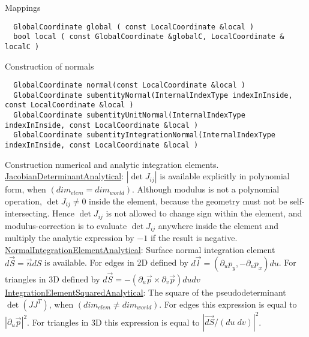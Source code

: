 Mappings \\
\begin{mybox}
\begin{lstlisting}
  GlobalCoordinate global ( const LocalCoordinate &local )
  bool local ( const GlobalCoordinate &globalC, LocalCoordinate & localC )
\end{lstlisting}
\end{mybox}


Construction of normals \\
\begin{mybox}
\begin{lstlisting}
  GlobalCoordinate normal(const LocalCoordinate &local )
  GlobalCoordinate subentityNormal(InternalIndexType indexInInside, const LocalCoordinate &local )
  GlobalCoordinate subentityUnitNormal(InternalIndexType indexInInside, const LocalCoordinate &local )
  GlobalCoordinate subentityIntegrationNormal(InternalIndexType indexInInside, const LocalCoordinate &local )
\end{lstlisting}
\end{mybox}


Construction numerical and analytic integration elements. \\

\noindent
\uline{JacobianDeterminantAnalytical}: $|\det J_{ij}|$ is available explicitly in polynomial form, when $(dim_{elem} = dim_{world})$. Although modulus is not a polynomial operation, $\det J_{ij} \neq 0$ inside the element, because the geometry must not be self-intersecting. Hence $\det J_{ij}$ is not allowed to change sign within the element, and modulus-correction is to evaluate $\det J_{ij}$ anywhere inside the element and multiply the analytic expression by $-1$ if the result is negative. \\

\noindent
\uline{NormalIntegrationElementAnalytical}: Surface normal integration element $d\vec{S} = \vec{n} dS $ is available. For edges in 2D defined by $d\vec{l} = (\partial_u p_y, -\partial_u p_x) du$. For triangles in 3D defined by $d \vec{S} = -(\partial_u \vec{p} \times \partial_v \vec{p}) du dv $ \\

\noindent
\uline{IntegrationElementSquaredAnalytical}: The square of the pseudodeterminant $\det(JJ^T)$, when $(dim_{elem} \neq dim_{world})$. For edges this expression is equal to $|\partial_u \vec{p}|^2$. For triangles in 3D this expression is equal to $|\vec{dS} / (du \; dv)|^2$. \\

